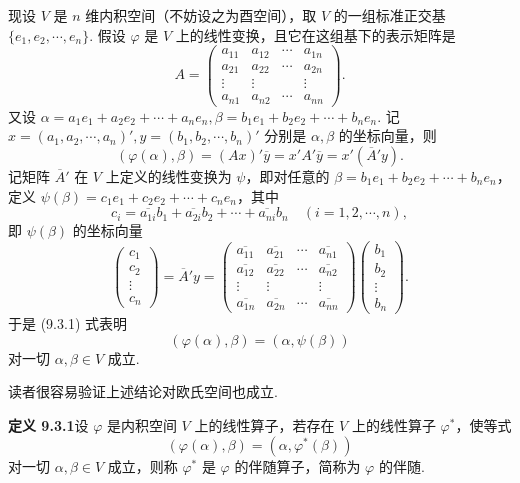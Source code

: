 \documentclass[UTF8, 12pt, fontset=fandol, oneside]{ctexart}
\begin{document}
现设 $V$ 是 $n$ 维内积空间（不妨设之为酉空间），取 $V$ 的一组标准正交基 $\{e_1,e_2,\cdots,e_n\}$. 假设 $\varphi$ 是 $V$ 上的线性变换，且它在这组基下的表示矩阵是
\[
  A=
  \left(\begin{array}{cccc}
    a_{11} & a_{12} & \cdots & a_{1n}\\
    a_{21} & a_{22} & \cdots & a_{2n}\\
    \vdots & \vdots & & \vdots\\
    a_{n1} & a_{n2} & \cdots & a_{nn}
  \end{array}\right).
\]
又设 $\alpha=a_1e_1+a_2e_2+\cdots+a_ne_n,\beta=b_1e_1+b_2e_2+\cdots+b_ne_n$. 记 $x=(a_1,a_2,\cdots,a_n)',y=(b_1,b_2,\cdots,b_n)'$ 分别是 $\alpha,\beta$ 的坐标向量，则
\begin{equation}
  (\varphi(\alpha),\beta)=(Ax)'\overline y=x'A'\overline y=x'(\overline A'y).
  \tag{9.3.1}
\end{equation}
记矩阵 $\overline A'$ 在 $V$ 上定义的线性变换为 $\psi$，即对任意的 $\beta=b_1e_1+b_2e_2+\cdots+b_ne_n$，定义 $\psi(\beta)=c_1e_1+c_2e_2+\cdots+c_ne_n$，其中
\[
  c_i=\overline{a_{1i}}b_1+\overline{a_{2i}}b_2+\cdots+\overline{a_{ni}}b_n\quad(i=1,2,\cdots,n),
\]
即 $\psi(\beta)$ 的坐标向量
\[
  \left(\begin{array}{c}
    c_1\\ c_2\\ \vdots\\ c_n
  \end{array}\right)
  =\overline A'y
  =
  \left(\begin{array}{cccc}
    \overline{a_{11}} & \overline{a_{21}} & \cdots & \overline{a_{n1}}\\
    \overline{a_{12}} & \overline{a_{22}} & \cdots & \overline{a_{n2}}\\
    \vdots & \vdots & & \vdots\\
    \overline{a_{1n}} & \overline{a_{2n}} & \cdots & \overline{a_{nn}}
  \end{array}\right)
  \left(\begin{array}{c}
    b_1\\ b_2\\ \vdots\\ b_n
  \end{array}\right).
\]
于是 (9.3.1) 式表明
\[
  (\varphi(\alpha),\beta)=(\alpha,\psi(\beta))
\]
对一切 $\alpha,\beta\in V$ 成立.

读者很容易验证上述结论对欧氏空间也成立.

\noindent\textbf{定义 9.3.1}\quad 设 $\varphi$ 是内积空间 $V$ 上的线性算子，若存在 $V$ 上的线性算子 $\varphi^*$，使等式
\[
  (\varphi(\alpha),\beta)=(\alpha,\varphi^*(\beta))
\]
对一切 $\alpha,\beta\in V$ 成立，则称 $\varphi^*$ 是 $\varphi$ 的伴随算子，简称为 $\varphi$ 的伴随.
\end{document}
